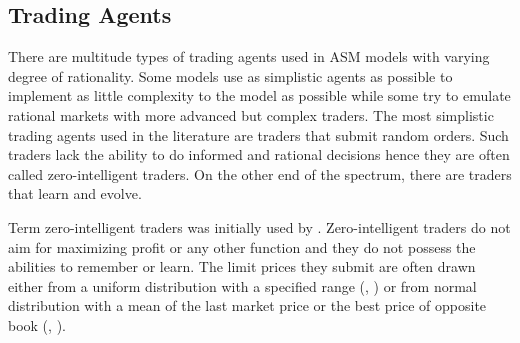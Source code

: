 \subsection{Trading Agents}

There are multitude types of trading agents used in ASM models with varying degree
of rationality. Some models use as simplistic agents as possible to implement as
little complexity to the model as possible while some try to emulate rational 
markets with more advanced but complex traders. The most simplistic trading agents
used in the literature are traders that submit random orders. Such traders
lack the ability to do informed and rational decisions hence they are often called
zero-intelligent traders. On the other end of the spectrum, there are traders
that learn and evolve. 

Term zero-intelligent traders was initially used by \citet{God93}. Zero-intelligent
traders do not aim for maximizing profit or any other function and they do not 
possess the abilities to remember or learn. The limit prices they submit are
often drawn either from a uniform distribution with a specified range (\citet{God93}, \citet{Mil08}) 
or from normal distribution with a mean of the last market price or the
best price of opposite book (\citet{Genoa01}, \citet{LIU20082535}).



